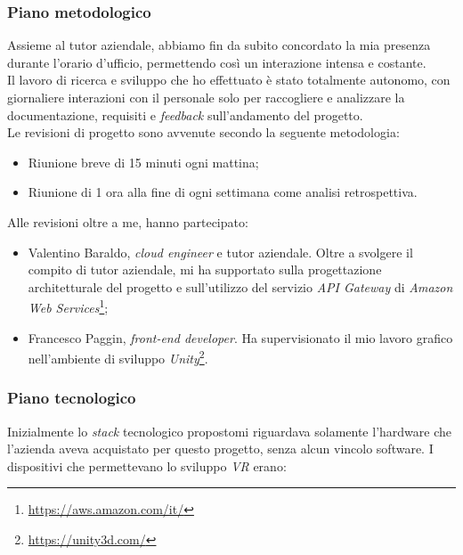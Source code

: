\subsubsection{Piano metodologico}
	
Assieme al tutor aziendale, abbiamo fin da subito concordato la mia presenza durante l'orario d'ufficio, permettendo così un interazione intensa e costante. \\
Il lavoro di ricerca e sviluppo che ho effettuato è stato totalmente autonomo, con giornaliere interazioni con il personale solo per raccogliere e analizzare la documentazione, requisiti e \textit{feedback} sull'andamento del progetto. \\
Le revisioni di progetto sono avvenute secondo la seguente metodologia:

\begin{itemize}
	\item Riunione breve di 15 minuti ogni mattina;
	\item Riunione di 1 ora alla fine di ogni settimana come analisi retrospettiva.
\end{itemize}

Alle revisioni oltre a me, hanno partecipato:

\begin{itemize}
	\item Valentino Baraldo, \textit{cloud engineer} e tutor aziendale. Oltre a svolgere il compito di tutor aziendale, mi ha supportato sulla progettazione architetturale del progetto e sull'utilizzo del servizio \textit{API Gateway} di \textit{Amazon Web Services}\footnote[1]{\url{https://aws.amazon.com/it/}};
	\item Francesco Paggin, \textit{front-end developer}. Ha supervisionato il mio lavoro grafico nell'ambiente di sviluppo \textit{Unity}\footnote[2]{\url{https://unity3d.com/}}.
\end{itemize}  

\subsubsection{Piano tecnologico}

Inizialmente lo \textit{stack} tecnologico propostomi riguardava solamente l'hardware che l'azienda aveva acquistato per questo progetto, senza alcun vincolo software. I dispositivi che permettevano lo sviluppo \textit{VR} erano:

